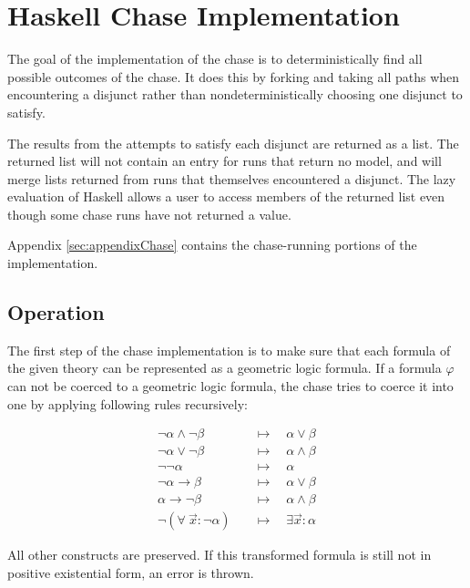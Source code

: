 \section{Haskell Chase Implementation}

	The goal of the implementation of the chase is to deterministically find
	all possible outcomes of the chase. It does this by forking and taking all
	paths when encountering a disjunct rather than nondeterministically
	choosing one disjunct to satisfy.

	The results from the attempts to satisfy each disjunct are returned as a
	list. The returned list will not contain an entry for runs that return no
	model, and will merge lists returned from runs that themselves encountered
	a disjunct. The lazy evaluation of Haskell allows a user to access members
	of the returned list even though some chase runs have not returned a value.

	Appendix \ref{sec:appendixChase} contains the chase-running portions of the implementation.

	\subsection{Operation}

	The first step of the chase implementation is to make sure that each
	formula of the given theory can be represented as a geometric logic
	formula. If a formula $\varphi$ can not be coerced to a geometric logic
	formula, the chase tries to coerce it into one by applying following rules
	recursively:

	\begin{align*}
	\neg\alpha \wedge \neg\beta         \quad & \mapsto \quad \alpha \vee \beta        \\
	\neg\alpha \vee \neg\beta           \quad & \mapsto \quad \alpha \wedge \beta      \\
	\neg\neg\alpha                      \quad & \mapsto \quad \alpha                   \\
	\neg\alpha \to \beta                \quad & \mapsto \quad \alpha \vee \beta        \\
	\alpha \to \neg\beta                \quad & \mapsto \quad \alpha \wedge \beta      \\
	\neg(\forall\ \vec{x} : \neg\alpha) \quad & \mapsto \quad \exists \vec{x} : \alpha
	\end{align*}

	All other constructs are preserved. If this transformed formula is still
	not in positive existential form, an error is thrown.

